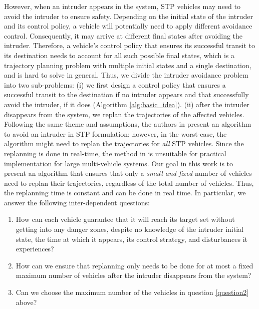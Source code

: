 However, when an intruder appears in the system, STP vehicles may need to avoid the intruder to ensure safety. Depending on the initial state of the intruder and its control policy, a vehicle will potentially need to apply different avoidance control. Consequently, it may arrive at different final states after avoiding the intruder. Therefore, a vehicle's control policy that ensures its successful transit to its destination needs to account for all such possible final states, which is a trajectory planning problem with multiple initial states and a single destination, and is hard to solve in general. Thus, we divide the intruder avoidance problem into two sub-problems: (i) we first design a control policy that ensures a successful transit to the destination if no intruder appears and that successfully avoid the intruder, if it does (Algorithm \ref{alg:basic_idea}). (ii) after the intruder disappears from the system, we replan the trajectories of the affected vehicles. Following the same theme and assumptions, the authors in \cite{chen2016robust} present an algorithm to avoid an intruder in STP formulation; however, in the worst-case, the algorithm might need to replan the trajectories for \textit{all} STP vehicles. Since the replanning is done in real-time, the method in \cite{chen2016robust} is unsuitable for practical implementation for large multi-vehicle systems. Our goal in this work is to present an algorithm that ensures that only a \textit{small and fixed} number of vehicles need to replan their trajectories, regardless of the total number of vehicles. Thus, the replanning time is constant and can be done in real time. In particular, we answer the following inter-dependent questions:
\begin{enumerate}
\item How can each vehicle guarantee that it will reach its target set without getting into any danger zones, despite no knowledge of the intruder initial state, the time at which it appears, its control strategy, and disturbances it experiences?
\item How can we ensure that replanning only needs to be done for at most a fixed maximum number of vehicles after the intruder disappears from the system? \label{question2}
\item Can we choose the maximum number of the vehicles in question \ref{question2} above?
\end{enumerate}

